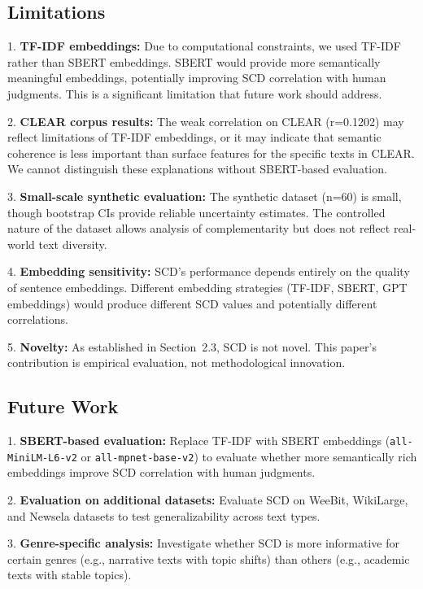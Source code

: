 \documentclass[11pt,letterpaper]{article}
\begin{document}
\subsection{Limitations}

1. \textbf{TF-IDF embeddings:} Due to computational constraints, we used TF-IDF rather than SBERT embeddings. SBERT would provide more semantically meaningful embeddings, potentially improving SCD correlation with human judgments. This is a significant limitation that future work should address.

2. \textbf{CLEAR corpus results:} The weak correlation on CLEAR (r=0.1202) may reflect limitations of TF-IDF embeddings, or it may indicate that semantic coherence is less important than surface features for the specific texts in CLEAR. We cannot distinguish these explanations without SBERT-based evaluation.

3. \textbf{Small-scale synthetic evaluation:} The synthetic dataset (n=60) is small, though bootstrap CIs provide reliable uncertainty estimates. The controlled nature of the dataset allows analysis of complementarity but does not reflect real-world text diversity.

4. \textbf{Embedding sensitivity:} SCD's performance depends entirely on the quality of sentence embeddings. Different embedding strategies (TF-IDF, SBERT, GPT embeddings) would produce different SCD values and potentially different correlations.

5. \textbf{Novelty:} As established in Section~2.3, SCD is not novel. This paper's contribution is empirical evaluation, not methodological innovation.

\subsection{Future Work}

1. \textbf{SBERT-based evaluation:} Replace TF-IDF with SBERT embeddings (\texttt{all-MiniLM-L6-v2} or \texttt{all-mpnet-base-v2}) to evaluate whether more semantically rich embeddings improve SCD correlation with human judgments.

2. \textbf{Evaluation on additional datasets:} Evaluate SCD on WeeBit, WikiLarge, and Newsela datasets to test generalizability across text types.

3. \textbf{Genre-specific analysis:} Investigate whether SCD is more informative for certain genres (e.g., narrative texts with topic shifts) than others (e.g., academic texts with stable topics).
\end{document}
